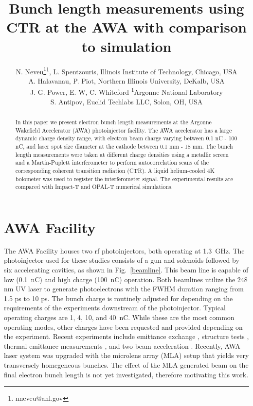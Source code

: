 \documentclass[letterpaper,  %
              ]{jacow-2_3}   %
\begin{document}
\title{Bunch length measurements using CTR at the AWA with comparison to simulation}

\author{N. Neveu\thanks{nneveu@anl.gov}\textsuperscript{1}, 
	    L. Spentzouris, Illinois Institute of Technology, Chicago, USA \\
		A. Halavanau, P. Piot, Northern Illinois University, DeKalb, USA \\
	    J. G. Power, E. W, C. Whiteford \textsuperscript{1}Argonne National  Laboratory \\
        S. Antipov, Euclid Techlabs LLC, Solon, OH, USA}
\maketitle

%
\begin{abstract}
In this paper we present electron bunch length measurements 
at the Argonne Wakefield Accelerator (AWA) photoinjector facility. 
The AWA accelerator has a large dynamic charge density range, 
with electron beam charge varying between 0.1 nC - 100 nC, 
and laser spot size diameter at the cathode between 0.1 mm - 18 mm. 
The bunch length measurements were taken at different charge densities 
using a metallic screen and a Martin-Puplett interferometer to perform 
autocorrelation scans of the corresponding coherent transition radiation (CTR). 
A liquid helium-cooled 4K bolometer was used to register the interferometer signal. 
The experimental results are compared with Impact-T and OPAL-T numerical simulations.
\end{abstract}


\section{AWA Facility}
The AWA Facility houses two rf photoinjectors, both 
operating at \SI{1.3}{GHz}. The photoinjector used for 
these studies consists of a gun and solenoids followed
by six accelerating cavities, as shown in Fig.~\ref{beamline}. 
This beam line is capable of low (\SI{0.1}{nC}) and 
high charge (\SI{100}{nC}) operation.
Both beamlines utilize the 248 nm UV laser 
to generate photoelectrons with the FWHM duration ranging from 1.5 ps to 10 ps.
The bunch charge is 
routinely adjusted for depending on the requirements 
of the experiments downstream of the photoinjector.
Typical operating charges are 1, 4, 10, and \SI{40}{nC}. 
While these are the most
common operating modes, other charges have been requested 
and provided depending on the experiment.
Recent experiments include emittance exchange \cite{eex}, 
structure tests \cite{pets}, thermal emittance measurements \cite{therm}, 
and two beam acceleration \cite{tba}. 
Recently, AWA laser system was upgraded with the microlens array (MLA) setup
that yields very transversely homegeneous bunches.
The effect of the MLA generated beam on the final electron 
bunch length is not yet investigated, therefore motivating
this work.
\end{document}
